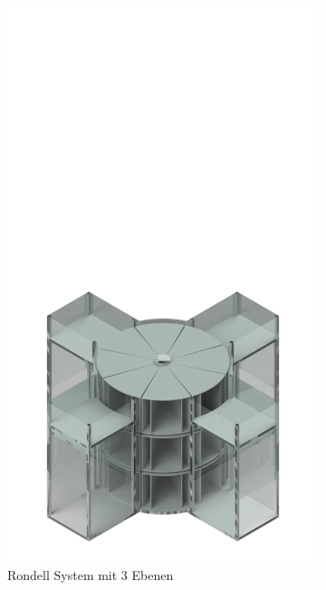 \begin{figure}[ht]
  \centering
  \begin{subfigure}{0.49\textwidth}
    \centering
    \includegraphics[width=\textwidth]{images/rondell_3.png}
    \caption{Rondell System mit 3 Ebenen}
    \label{fig:rondell_3}
  \end{subfigure}
  \begin{subfigure}{0.49\textwidth}
    \centering

\end{subfigure}
\end{figure}
